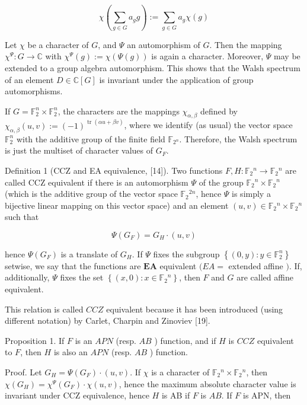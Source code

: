 \documentclass[10pt]{article}
\begin{document}
$$
\chi\left(\sum_{g \in G} a_{g} g\right):=\sum_{g \in G} a_{g} \chi(g)
$$

Let $\chi$ be a character of $G$, and $\Psi$ an automorphism of $G$. Then the mapping $\chi^{\Psi}: G \rightarrow \mathbb{C}$ with $\chi^{\Psi}(g):=\chi(\Psi(g))$ is again a character. Moreover, $\Psi$ may be extended to a group algebra automorphism. This shows that the Walsh spectrum of an element $D \in \mathbb{C}[G]$ is invariant under the application of group automorphisms.

If $G=\mathbb{F}_{2}^{n} \times \mathbb{F}_{2}^{n}$, the characters are the mappings $\chi_{\alpha, \beta}$ defined by $\chi_{\alpha, \beta}(u, v):=(-1)^{\operatorname{tr}(\alpha u+\beta v)}$, where we identify (as usual) the vector space $\mathbb{F}_{2}^{n}$ with the additive group of the finite field $\mathbb{F}_{2^{n}}$. Therefore, the Walsh spectrum is just the multiset of character values of $G_{F}$.

Definition 1 (CCZ and EA equivalence, [14]). Two functions $F, H: \mathbb{F}_{2}{ }^{n} \rightarrow \mathbb{F}_{2}{ }^{n}$ are called CCZ equivalent if there is an automorphism $\Psi$ of the group $\mathbb{F}_{2}{ }^{n} \times \mathbb{F}_{2}{ }^{n}$ (which is the additive group of the vector space $\mathbb{F}_{2}{ }^{2 n}$, hence $\Psi$ is simply a bijective linear mapping on this vector space) and an element $(u, v) \in \mathbb{F}_{2}{ }^{n} \times \mathbb{F}_{2}{ }^{n}$ such that

$$
\Psi\left(G_{F}\right)=G_{H} \cdot(u, v)
$$

hence $\Psi\left(G_{F}\right)$ is a translate of $G_{H}$. If $\Psi$ fixes the subgroup $\left\{(0, y): y \in \mathbb{F}_{2}^{n}\right\}$ setwise, we say that the functions are $\mathbf{E A}$ equivalent $(E A=$ extended affine $)$. If, additionally, $\Psi$ fixes the set $\left\{(x, 0): x \in \mathbb{F}_{2}{ }^{n}\right\}$, then $F$ and $G$ are called affine equivalent.

This relation is called $C C Z$ equivalent because it has been introduced (using different notation) by Carlet, Charpin and Zinoviev [19].

Proposition 1. If $F$ is an $A P N$ (resp. $A B$ ) function, and if $H$ is $C C Z$ equivalent to $F$, then $H$ is also an $A P N$ (resp. $A B$ ) function.

Proof. Let $G_{H}=\Psi\left(G_{F}\right) \cdot(u, v)$. If $\chi$ is a character of $\mathbb{F}_{2}{ }^{n} \times \mathbb{F}_{2}{ }^{n}$, then $\chi\left(G_{H}\right)=\chi^{\Psi}\left(G_{F}\right) \cdot \chi(u, v)$, hence the maximum absolute character value is invariant under CCZ equivalence, hence $H$ is AB if $F$ is $A B$. If $F$ is APN, then
\end{document}
